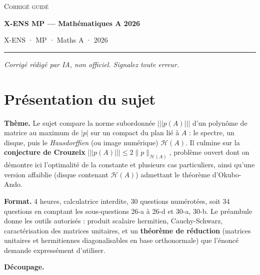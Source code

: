\documentclass[11pt,a4paper]{article}
\begin{document}
\thispagestyle{plain}
\begin{center}
  {\small\scshape Corrigé guidé}\par\smallskip
  {\LARGE\bfseries X-ENS MP — Mathématiques A 2026\par}\medskip
  {\large X-ENS · MP · Maths A · 2026\par}
\end{center}
\vspace{2pt}\hrule\vspace{8pt}

\emph{Corrigé rédigé par IA, non officiel. Signalez toute erreur.}

\hypertarget{pruxe9sentation-du-sujet}{%
\section{Présentation du sujet}\label{pruxe9sentation-du-sujet}}

\textbf{Thème.} Le sujet compare la norme subordonnée \(\vert\!\vert\!\vert p(A)\vert\!\vert\!\vert\) d'un polynôme de matrice au maximum de \(|p|\) sur un compact du plan lié à \(A\) : le spectre, un disque, puis le \emph{Hausdorffien} (ou image numérique) \(\mathcal H(A)\). Il culmine sur la \textbf{conjecture de Crouzeix} \(\vert\!\vert\!\vert p(A)\vert\!\vert\!\vert \le2\|p\|_{\mathcal H(A)}\), problème ouvert dont on démontre ici l'optimalité de la constante et plusieurs cas particuliers, ainsi qu'une version affaiblie (disque contenant \(\mathcal H(A)\)) admettant le théorème d'Okubo-Ando.

\textbf{Format.} 4 heures, calculatrice interdite, 30 questions numérotées, soit 34 questions en comptant les sous-questions 26-a à 26-d et 30-a, 30-b. Le préambule donne les outils autorisés : produit scalaire hermitien, Cauchy-Schwarz, caractérisation des matrices unitaires, et un \textbf{théorème de réduction} (matrices unitaires et hermitiennes diagonalisables en base orthonormale) que l'énoncé demande expressément d'utiliser.

\textbf{Découpage.}
\end{document}
